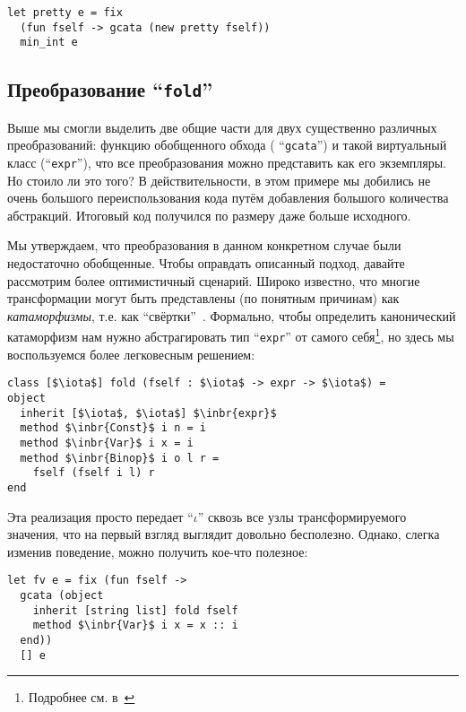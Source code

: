 \begin{lstlisting}
let pretty e = fix 
  (fun fself -> gcata (new pretty fself))
  min_int e
\end{lstlisting}

\subsection{Преобразование ``\texttt{fold}''} 

Выше мы смогли выделить две общие части для двух существенно различных преобразований: функцию обобщенного обхода
( ``\lstinline{gcata}'') и такой виртуальный класс (``\lstinline{expr}''), что все преобразования можно представить как его экземпляры.
Но стоило ли это того? В действительности, в этом примере мы добились не очень большого переиспользования кода путём добавления
большого количества абстракций. Итоговый код получился по размеру даже больше исходного.

Мы утверждаем, что преобразования в данном конкретном случае были недостаточно обобщенные. Чтобы оправдать описанный подход,
давайте рассмотрим более оптимистичный сценарий. Широко известно, что многие трансформации могут быть представлены 
(по понятным причинам) как \emph{катаморфизмы}, т.е. как ``свёртки''~\cite{CalculatingFP,Fold,Bananas}. 
Формально, чтобы определить канонический катаморфизм нам нужно абстрагировать тип ``\lstinline{expr}'' 
от самого себя\footnote{Подробнее см. в~\cite{CalculatingFP}}, но здесь мы воспользуемся более легковесным решением:


\begin{lstlisting}
class [$\iota$] fold (fself : $\iota$ -> expr -> $\iota$) = 
object 
  inherit [$\iota$, $\iota$] $\inbr{expr}$ 
  method $\inbr{Const}$ i n = i
  method $\inbr{Var}$ i x = i
  method $\inbr{Binop}$ i o l r = 
    fself (fself i l) r
end
\end{lstlisting}

\noindent Эта реализация просто передает ``$\iota$'' сквозь все узлы трансформируемого значения, что на первый взгляд выглядит довольно бесполезно.
Однако, слегка изменив поведение, можно получить кое-что полезное:

\begin{lstlisting}
let fv e = fix (fun fself ->
  gcata (object 
    inherit [string list] fold fself
    method $\inbr{Var}$ i x = x :: i
  end)) 
  [] e
\end{lstlisting}

